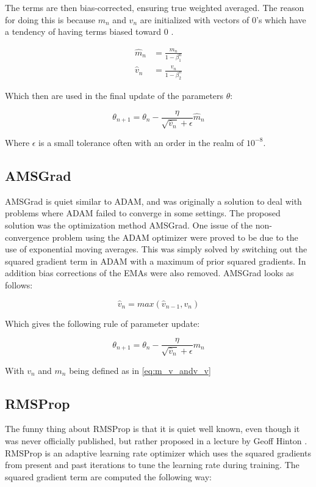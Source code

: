 \documentclass[../main.tex]{subfiles}
\begin{document}
The terms are then bias-corrected, ensuring true weighted averaged. The reason for doing this is because $m_n$ and $v_n$ are initialized with vectors of 0's which have a tendency of having terms biased toward 0 \cite{ruder2017overview}.

\begin{align*}
\hat{m}_{n} &=\frac{m_{n}}{1-\beta_{1}^{n}} \\
\hat{v}_{n} &=\frac{v_{n}}{1-\beta_{2}^{n}}
\end{align*}

Which then are used in the final update of the parameters $\theta$:

\begin{equation*}
\theta_{n+1}=\theta_{n}-\frac{\eta}{\sqrt{\hat{v}_{n}}+\epsilon} \hat{m}_{n}
\end{equation*}

Where $\epsilon$ is a small tolerance often with an order in the realm of $10^{-8}$.

\subsection{AMSGrad}
AMSGrad is quiet similar to ADAM, and was originally a solution to deal with problems where ADAM failed to converge in some settings. The proposed solution was the optimization method AMSGrad. One issue of the non-convergence problem using the ADAM optimizer were proved to be due to the use of exponential moving averages\cite{amsgrad_article}. This was simply solved by switching out the squared gradient term in ADAM with a maximum of prior squared gradients. In addition bias corrections of the EMAs were also removed. AMSGrad looks as follows:

\begin{equation*}
    \hat{v}_{n} =\textit{max}(\hat{v}_{n-1}, {v}_{n})
\end{equation*}

Which gives the following rule of parameter update:

\begin{equation*}
\theta_{n+1}=\theta_{n}-\frac{\eta}{\sqrt{\hat{v}_{n}}+\epsilon} {m}_{n}
\end{equation*}

With $v_n$ and $m_n$ being defined as in \autoref{eq:m_v_andv_v}

\subsection{RMSProp}
The funny thing about RMSProp is that it is quiet well known, even though it was never officially published, but rather proposed in a lecture by Geoff Hinton \cite{ruder2017overview}. RMSProp is an adaptive learning rate optimizer which uses the squared gradients from present and past iterations to tune the learning rate during training. The squared gradient term are computed the following way:
\end{document}
